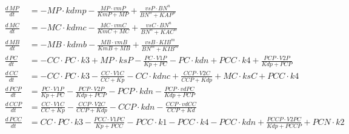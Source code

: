\begin{model}[p]
  \centering
  \label{mod:leloupeqs}
  \footnotesize

  \begin{align*}
    \frac{d\,\mathit{MP}}{dt} &= - \mathit{MP} \cdot \mathit{kdmp} - \frac{\mathit{MP} \cdot \mathit{vmP}}{\mathit{KmP} + \mathit{MP}} + \frac{\mathit{vsP} \cdot {\mathit{BN}}^{\mathit{n}}}{{\mathit{BN}}^{\mathit{n}} + {\mathit{KAP}}^{\mathit{n}}}\\
    \frac{d\,\mathit{MC}}{dt} &= - \mathit{MC} \cdot \mathit{kdmc} - \frac{\mathit{MC} \cdot \mathit{vmC}}{\mathit{KmC} + \mathit{MC}} + \frac{\mathit{vsC} \cdot {\mathit{BN}}^{\mathit{n}}}{{\mathit{BN}}^{\mathit{n}} + {\mathit{KAC}}^{\mathit{n}}}\\
    \frac{d\,\mathit{MB}}{dt} &= - \mathit{MB} \cdot \mathit{kdmb} - \frac{\mathit{MB} \cdot \mathit{vmB}}{\mathit{KmB} + \mathit{MB}} + \frac{\mathit{vsB} \cdot {\mathit{KIB}}^{\mathit{m}}}{{\mathit{BN}}^{\mathit{m}} + {\mathit{KIB}}^{\mathit{m}}}\\
    \frac{d\,\mathit{PC}}{dt} &= - \mathit{CC} \cdot \mathit{PC} \cdot \mathit{k3} + \mathit{MP} \cdot \mathit{ksP} - \frac{\mathit{PC} \cdot \mathit{V1P}}{\mathit{Kp} + \mathit{PC}} - \mathit{PC} \cdot \mathit{kdn} + \mathit{PCC} \cdot \mathit{k4} + \frac{\mathit{PCP} \cdot \mathit{V2P}}{\mathit{Kdp} + \mathit{PCP}}\\
    \frac{d\,\mathit{CC}}{dt} &= - \mathit{CC} \cdot \mathit{PC} \cdot \mathit{k3} - \frac{\mathit{CC} \cdot \mathit{V1C}}{\mathit{CC} + \mathit{Kp}} - \mathit{CC} \cdot \mathit{kdnc} + \frac{\mathit{CCP} \cdot \mathit{V2C}}{\mathit{CCP} + \mathit{Kdp}} + \mathit{MC} \cdot \mathit{ksC} + \mathit{PCC} \cdot \mathit{k4}\\
    \frac{d\,\mathit{PCP}}{dt} &= \frac{\mathit{PC} \cdot \mathit{V1P}}{\mathit{Kp} + \mathit{PC}} - \frac{\mathit{PCP} \cdot \mathit{V2P}}{\mathit{Kdp} + \mathit{PCP}} - \mathit{PCP} \cdot \mathit{kdn} - \frac{\mathit{PCP} \cdot \mathit{vdPC}}{\mathit{Kdp} + \mathit{PCP}}\\
    \frac{d\,\mathit{CCP}}{dt} &= \frac{\mathit{CC} \cdot \mathit{V1C}}{\mathit{CC} + \mathit{Kp}} - \frac{\mathit{CCP} \cdot \mathit{V2C}}{\mathit{CCP} + \mathit{Kdp}} - \mathit{CCP} \cdot \mathit{kdn} - \frac{\mathit{CCP} \cdot \mathit{vdCC}}{\mathit{CCP} + \mathit{Kd}}\\
    \frac{d\,\mathit{PCC}}{dt} &= \mathit{CC} \cdot \mathit{PC} \cdot \mathit{k3} - \frac{\mathit{PCC} \cdot \mathit{V1PC}}{\mathit{Kp} + \mathit{PCC}} - \mathit{PCC} \cdot \mathit{k1} - \mathit{PCC} \cdot \mathit{k4} - \mathit{PCC} \cdot \mathit{kdn} + \frac{\mathit{PCCP} \cdot \mathit{V2PC}}{\mathit{Kdp} + \mathit{PCCP}} + \mathit{PCN} \cdot \mathit{k2}\\

\end{align*}
\end{model}

